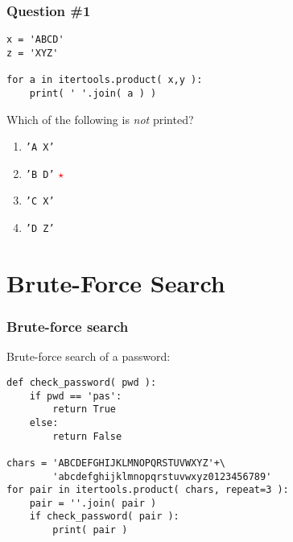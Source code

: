 \documentclass[11pt]{beamer}
\newcommand{\correctstar}{{\Large\textcolor{red}{$\star$}}}
\begin{document}
\begin{frame}[fragile]
  \frametitle{Question \#1}

  \begin{Verbatim}
x = 'ABCD'
z = 'XYZ'

for a in itertools.product( x,y ):
    print( ' '.join( a ) )
  \end{Verbatim}

Which of the following is \emph{not} printed?

  \begin{enumerate}[label=\Alph*]
    \item  \texttt{'A X'}
    \item  \texttt{'B D'}  \correctstar
    \item  \texttt{'C X'}
    \item  \texttt{'D Z'}
  \end{enumerate}
\end{frame}



\section{Brute-Force Search}

\begin{frame}[fragile]
  \frametitle{Brute-force search}

  \begin{enumerate}
  \myitem  Brute-force search of a password: %
  \end{enumerate}
  \begin{Verbatim}
def check_password( pwd ):
    if pwd == 'pas':
        return True
    else:
        return False

chars = 'ABCDEFGHIJKLMNOPQRSTUVWXYZ'+\
        'abcdefghijklmnopqrstuvwxyz0123456789'
for pair in itertools.product( chars, repeat=3 ):
    pair = ''.join( pair )
    if check_password( pair ):
        print( pair )
  \end{Verbatim}
\end{frame}
\end{document}
